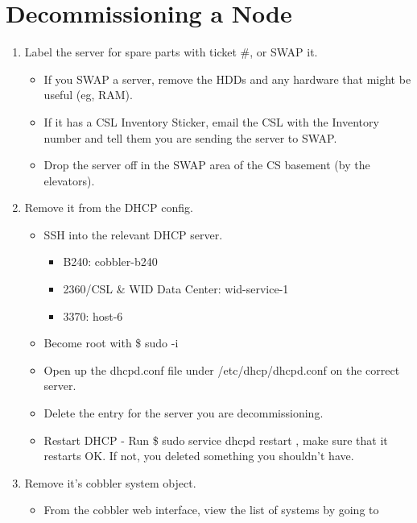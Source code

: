 \documentclass[10pt,letterpaper]{article}
\begin{document}
\section{Decommissioning a Node}
    \begin{enumerate}
        \item Label the server for spare parts with ticket \#, or SWAP it.
        \begin{itemize}
            \item If you SWAP a server, remove the HDDs and any hardware that might be useful (eg, RAM).
            \item If it has a CSL Inventory Sticker, email the CSL with the Inventory number
            and tell them you are sending the server to SWAP.
            \item Drop the server off in the SWAP area of the CS basement (by the elevators).
        \end{itemize}
        \item Remove it from the DHCP config.
        \begin{itemize}
            \item SSH into the relevant DHCP server.
            \begin{itemize}
                \item B240: cobbler-b240
                \item 2360/CSL \& WID Data Center: wid-service-1
                \item 3370: host-6
            \end{itemize}
            \item Become root with {\selectfont \$ sudo -i }
            \item Open up the dhcpd.conf file under /etc/dhcp/dhcpd.conf on the correct server.
            \item Delete the entry for the server you are decommissioning.
            \item Restart DHCP - Run {\selectfont \$ sudo service dhcpd restart }, make
            sure that it restarts OK. If not, you deleted something you shouldn't have.
        \end{itemize}
        \item Remove it's cobbler system object.
            \begin{itemize}
                \item From the cobbler web interface, view the list of systems by going to \\

\end{itemize}
\end{enumerate}
\end{document}
